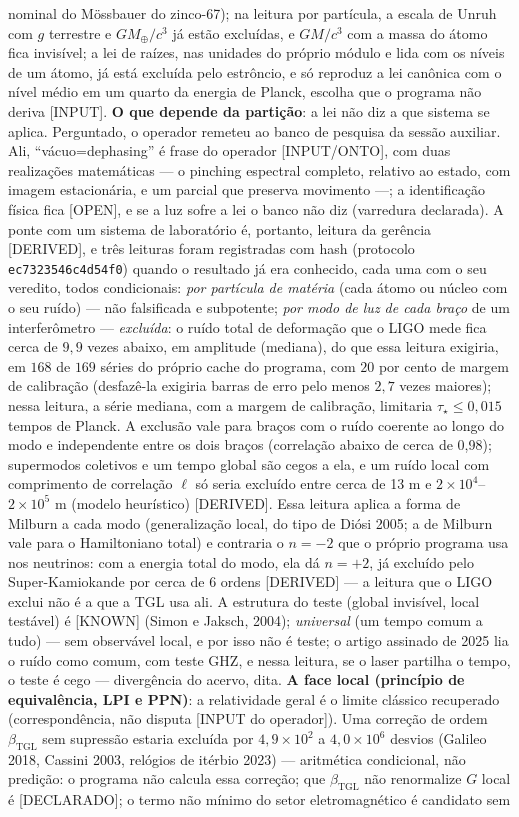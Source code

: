 \documentclass[11pt]{article}
\newcommand{\bTGL}{\beta_{\mathrm{TGL}}}\newcommand{\Msun}{M_{\odot}}\newcommand{\TGL}{\mathrm{TGL}}
\theoremstyle{definition}\newtheorem{deriv}{Derivação}
\begin{document}
nominal do Mössbauer do zinco-67); na leitura por partícula, a escala de Unruh com $g$ terrestre e $GM_\oplus/c^3$ já estão excluídas, e $GM/c^3$ com a massa do átomo fica invisível; a lei de raízes, nas unidades do próprio módulo e lida com os níveis de um átomo, já está excluída pelo estrôncio, e só reproduz a lei canônica com o nível médio em um quarto da energia de Planck, escolha que o programa não deriva [INPUT]. \textbf{O que depende da partição}: a lei não diz a que sistema se aplica. Perguntado, o operador remeteu ao banco de pesquisa da sessão auxiliar. Ali, ``vácuo=dephasing'' é frase do operador [INPUT/ONTO], com duas realizações matemáticas --- o pinching espectral completo, relativo ao estado, com imagem estacionária, e um parcial que preserva movimento ---; a identificação física fica [OPEN], e se a luz sofre a lei o banco não diz (varredura declarada). A ponte com um sistema de laboratório é, portanto, leitura da gerência [DERIVED], e três leituras foram registradas com hash (protocolo \texttt{ec7323546c4d54f0}) quando o resultado já era conhecido, cada uma com o seu veredito, todos condicionais: \emph{por partícula de matéria} (cada átomo ou núcleo com o seu ruído) --- não falsificada e subpotente; \emph{por modo de luz de cada braço} de um interferômetro --- \emph{excluída}: o ruído total de deformação que o LIGO mede fica cerca de $9{,}9$ vezes abaixo, em amplitude (mediana), do que essa leitura exigiria, em $168$ de $169$ séries do próprio cache do programa, com $20$ por cento de margem de calibração (desfazê-la exigiria barras de erro pelo menos $2{,}7$ vezes maiores); nessa leitura, a série mediana, com a margem de calibração, limitaria $\tau_\star\le 0{,}015$ tempos de Planck. A exclusão vale para braços com o ruído coerente ao longo do modo e independente entre os dois braços (correlação abaixo de cerca de 0{,}98); supermodos coletivos e um tempo global são cegos a ela, e um ruído local com comprimento de correlação $\ell$ só seria excluído entre cerca de 13 m e $2\times10^{4}$--$2\times10^{5}$ m (modelo heurístico) [DERIVED]. Essa leitura aplica a forma de Milburn a cada modo (generalização local, do tipo de Diósi 2005; a de Milburn vale para o Hamiltoniano total) e contraria o $n=-2$ que o próprio programa usa nos neutrinos: com a energia total do modo, ela dá $n=+2$, já excluído pelo Super-Kamiokande por cerca de 6 ordens [DERIVED] --- a leitura que o LIGO exclui não é a que a TGL usa ali. A estrutura do teste (global invisível, local testável) é [KNOWN] (Simon e Jaksch, 2004); \emph{universal} (um tempo comum a tudo) --- sem observável local, e por isso não é teste; o artigo assinado de 2025 lia o ruído como comum, com teste GHZ, e nessa leitura, se o laser partilha o tempo, o teste é cego --- divergência do acervo, dita. \textbf{A face local (princípio de equivalência, LPI e PPN)}: a relatividade geral é o limite clássico recuperado (correspondência, não disputa [INPUT do operador]). Uma correção de ordem $\bTGL$ sem supressão estaria excluída por $4{,}9\times10^{2}$ a $4{,}0\times10^{6}$ desvios (Galileo 2018, Cassini 2003, relógios de itérbio 2023) --- aritmética condicional, não predição: o programa não calcula essa correção; que $\bTGL$ não renormalize $G$ local é [DECLARADO]; o termo não mínimo do setor eletromagnético é candidato sem 
\end{document}
